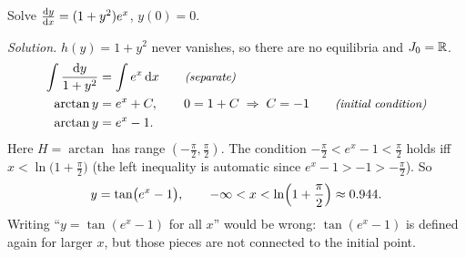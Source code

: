 \begin{example}\label{ex:ch03-arctan}
Solve $\frac{\mathrm{d}y}{\mathrm{d}x} = (1 + y^2)e^x$, $y(0) = 0$.

\emph{Solution.} $h(y) = 1 + y^2$ never vanishes, so there are no equilibria
and $J_0 = \mathbb{R}$.
\begin{align*}
  \int\frac{\mathrm{d}y}{1+y^2} &= \int e^x\,\mathrm{d}x \qquad\text{\small\itshape(separate)}\\
  \arctan y &= e^x + C,\qquad 0 = 1 + C\;\Rightarrow\;C = -1
     \qquad\text{\small\itshape(initial condition)}\\
  \arctan y &= e^x - 1 .
\end{align*}
Here $H = \arctan$ has range $(-\frac\pi2,\frac\pi2)$. The condition
$-\frac\pi2 < e^x - 1 < \frac\pi2$ holds iff $x<\ln\bigl(1 + \frac\pi2\bigr)$
(the left inequality is automatic since $e^x - 1 > -1 > -\frac\pi2$). So
\[
  y = \tan\bigl(e^x - 1\bigr),\qquad -\infty<x<\ln\Bigl(1 + \frac\pi2\Bigr)\approx 0.944 .
\]
Writing ``$y = \tan(e^x - 1)$ for all $x$'' would be wrong:
$\tan(e^x-1)$ is defined again for larger $x$, but those pieces are not
connected to the initial point.
\end{example}

